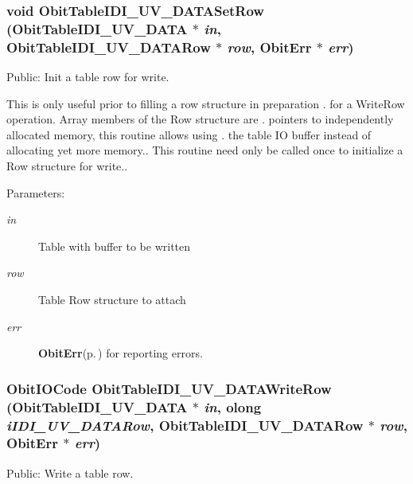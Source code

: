 \subsubsection{\setlength{\rightskip}{0pt plus 5cm}void Obit\-Table\-IDI\_\-UV\_\-DATASet\-Row ({\bf Obit\-Table\-IDI\_\-UV\_\-DATA} $\ast$ {\em in}, {\bf Obit\-Table\-IDI\_\-UV\_\-DATARow} $\ast$ {\em row}, {\bf Obit\-Err} $\ast$ {\em err})}\label{ObitTableIDI__UV__DATA_8h_a19}


Public: Init a table row for write. 

This is only useful prior to filling a row structure in preparation . for a Write\-Row operation. Array members of the Row structure are . pointers to independently allocated memory, this routine allows using . the table IO buffer instead of allocating yet more memory.. This routine need only be called once to initialize a Row structure for write.. \begin{Desc}
\item[Parameters:]
\begin{description}
\item[{\em in}]Table with buffer to be written \item[{\em row}]Table Row structure to attach \item[{\em err}]{\bf Obit\-Err}{\rm (p.\,\pageref{structObitErr})} for reporting errors. \end{description}
\end{Desc}
\subsubsection{\setlength{\rightskip}{0pt plus 5cm}Obit\-IOCode Obit\-Table\-IDI\_\-UV\_\-DATAWrite\-Row ({\bf Obit\-Table\-IDI\_\-UV\_\-DATA} $\ast$ {\em in}, {\bf olong} {\em i\-IDI\_\-UV\_\-DATARow}, {\bf Obit\-Table\-IDI\_\-UV\_\-DATARow} $\ast$ {\em row}, {\bf Obit\-Err} $\ast$ {\em err})}\label{ObitTableIDI__UV__DATA_8h_a20}


Public: Write a table row. 

